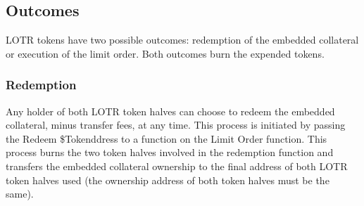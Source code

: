 \documentclass[12pt]{article}
\begin{document}
      \subsection*{Outcomes}
         LOTR tokens have two possible outcomes: redemption of the embedded collateral or execution of the limit order. Both outcomes burn the expended tokens.
         \subsubsection*{Redemption}
            Any holder of both LOTR token halves can choose to redeem the embedded collateral, minus transfer fees, at any time. This process is initiated by passing the Redeem \$Tokenddress to a function on the Limit Order function. This process burns the two token halves involved in the redemption function and transfers the embedded collateral ownership to the final address of both LOTR token halves used (the ownership address of both token halves must be the same).
\end{document}
